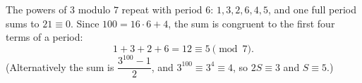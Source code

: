 The powers of $3$ modulo $7$ repeat with period $6$: $1,3,2,6,4,5$, and one full period sums to $21\equiv0$. Since $100=16\cdot6+4$, the sum is congruent to the first four terms of a period:
\[
1+3+2+6=12\equiv\boxed{5}\pmod 7.
\]
(Alternatively the sum is $\dfrac{3^{100}-1}{2}$, and $3^{100}\equiv3^4\equiv4$, so $2S\equiv3$ and $S\equiv5$.)
